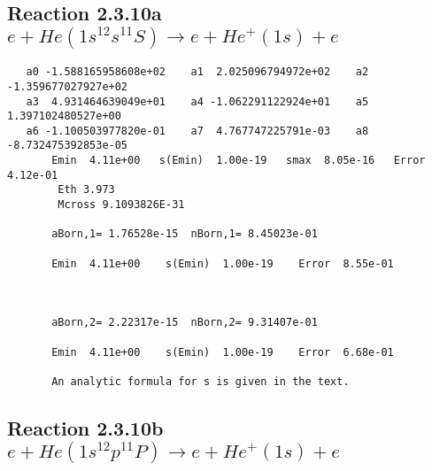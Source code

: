 \documentclass[12pt,dvipdfmx]{article}
\begin{document}
\newpage
\subsection{
Reaction 2.3.10a $ e + He(1s^12s^11S) \rightarrow e + He^+(1s) + e$}





\begin{small}\begin{verbatim}
   a0 -1.588165958608e+02    a1  2.025096794972e+02    a2 -1.359677027927e+02
   a3  4.931464639049e+01    a4 -1.062291122924e+01    a5  1.397102480527e+00
   a6 -1.100503977820e-01    a7  4.767747225791e-03    a8 -8.732475392853e-05
       Emin  4.11e+00   s(Emin)  1.00e-19   smax  8.05e-16   Error  4.12e-01
        Eth 3.973
        Mcross 9.1093826E-31

       aBorn,1= 1.76528e-15  nBorn,1= 8.45023e-01

       Emin  4.11e+00    s(Emin)  1.00e-19    Error  8.55e-01



       aBorn,2= 2.22317e-15  nBorn,2= 9.31407e-01

       Emin  4.11e+00    s(Emin)  1.00e-19    Error  6.68e-01

       An analytic formula for s is given in the text.
\end{verbatim}\end{small}







\newpage
\subsection{
Reaction 2.3.10b $e + He(1s^12p^11P) \rightarrow e + He^+(1s) + e$}






\end{document}
